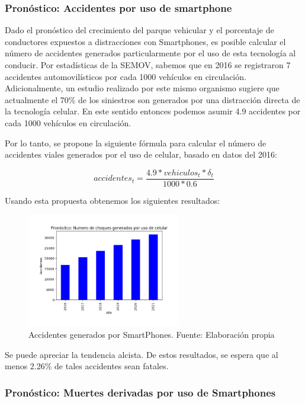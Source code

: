 \documentclass{article}
\begin{document}
\subsubsection{Pronóstico: Accidentes por uso de smartphone}

Dado el pronóstico del crecimiento del parque vehicular y el porcentaje de conductores expuestos a
distracciones con Smartphones, es posible calcular el número de accidentes generados particularmente
por el uso de esta tecnología al conducir. Por estadísticas de la SEMOV, sabemos que en 2016 se registraron 7
accidentes automovilísticos por cada 1000 vehículos en circulación. Adicionalmente, un estudio realizado por este
mismo organismo sugiere que actualmente el 70\% de los siniestros son generados por una distracción directa de la
tecnología celular. En este sentido entonces podemos asumir 4.9 accidentes por cada 1000 vehículos en circulación.

Por lo tanto, se propone la siguiente fórmula para calcular el número de accidentes viales generados por el uso
de celular, basado en datos del 2016:

\begin{equation}
accidentes_{t} = \frac{4.9 * vehiculos_t * \delta_t}{1000 * 0.6}
\end{equation}

Usando esta propuesta obtenemos los siguientes resultados:

	\begin{figure}[H]\centering
	\includegraphics[width=0.6\textwidth]{resources/img/smart_accidents.png}
	\caption{\label{fig:smart_accidents} Accidentes generados por SmartPhones. Fuente: Elaboración propia}
    \end{figure}

Se puede apreciar la tendencia alcista. De estos resultados, se espera que al menos 2.26\% de tales accidentes sean
fatales.

\subsubsection{Pronóstico: Muertes derivadas por uso de Smartphones}
\end{document}
